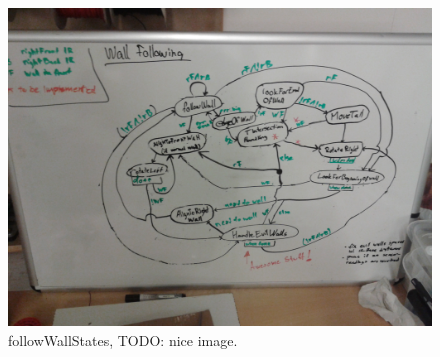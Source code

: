 \begin{figure}[h]
    \begin{centering}
   	 \includegraphics[scale=0.15]{figures/followWallStates.jpg}
   	 \caption{followWallStates, TODO: nice image.}\label{fig:followWallStates}
    \end{centering}
\end{figure}

